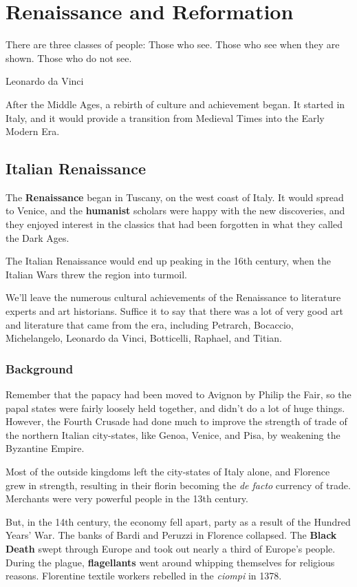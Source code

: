 \chapter{Renaissance and Reformation}

\epigraph{%
  There are three classes of people:
  Those who see.
  Those who see when they are shown.
  Those who do not see.
}{Leonardo da Vinci}

After the Middle Ages, a rebirth of culture and achievement began.
It started in Italy, and it would provide a transition from Medieval Times into the Early Modern Era.

\section{Italian Renaissance}

The \textbf{Renaissance} began in Tuscany, on the west coast of Italy.
It would spread to Venice, and the \textbf{humanist} scholars were happy with the new discoveries,
and they enjoyed interest in the classics that had been forgotten in what they called the Dark Ages.

The Italian Renaissance would end up peaking in the 16th century, when the Italian Wars threw the region into turmoil.

We'll leave the numerous cultural achievements of the Renaissance to literature experts and art historians.
Suffice it to say that there was a lot of very good art and literature that came from the era,
including Petrarch, Bocaccio, Michelangelo, Leonardo da Vinci, Botticelli, Raphael, and Titian.

\subsection*{Background}

Remember that the papacy had been moved to Avignon by Philip the Fair,
so the papal states were fairly loosely held together, and didn't do a lot of huge things.
However, the Fourth Crusade had done much to improve the strength of trade of the northern Italian city-states,
like Genoa, Venice, and Pisa, by weakening the Byzantine Empire.

Most of the outside kingdoms left the city-states of Italy alone,
and Florence grew in strength, resulting in their florin becoming the \textit{de facto} currency of trade.
Merchants were very powerful people in the 13th century.

But, in the 14th century, the economy fell apart, party as a result of the Hundred Years' War.
The banks of Bardi and Peruzzi in Florence collapsed.
The \textbf{Black Death} swept through Europe and took out nearly a third of Europe's people.
During the plague, \textbf{flagellants} went around whipping themselves for religious reasons.
Florentine textile workers rebelled in the \textit{ciompi} in 1378.

